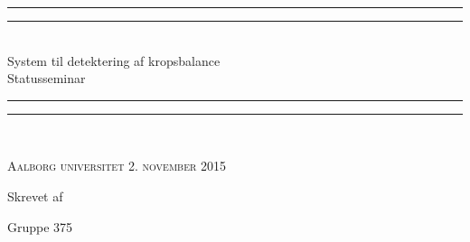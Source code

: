 \thispagestyle{empty}
\begin{center}
\vspace*{\baselineskip}
\rule{\textwidth}{1.6pt}\vspace*{-\baselineskip}\vspace*{2pt} %
\rule{\textwidth}{0.4pt}\\[\baselineskip] %

{\LARGE System til detektering af kropsbalance\\[0.3\baselineskip] \large Statusseminar}\\[0.2\baselineskip] %

\rule{\textwidth}{0.4pt}\vspace*{-\baselineskip}\vspace{3.2pt} %
\rule{\textwidth}{1.6pt}\\[\baselineskip] %

\vspace*{1\baselineskip}

\scshape %
Aalborg universitet 2. november 2015 \par %

\vspace*{1\baselineskip} %

Skrevet af \\%
{\Large Gruppe 375\par}
\end{center} %


